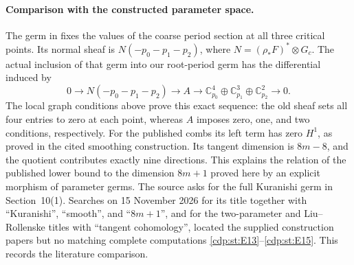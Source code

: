 \paragraph{Comparison with the constructed parameter space.}
The germ in \cite[Lemma labelled \texttt{paramspace} and
Proposition labelled \texttt{effective}]{Viaclovsky2026Combs}
fixes the values of the coarse period section at all three
critical points. Its normal sheaf is $N(-p_0-p_1-p_2)$, where
$N=(\rho_*F)^*\otimes G_c$. The actual inclusion of that germ
into our root-period germ has the differential induced by
\[
0\longrightarrow N(-p_0-p_1-p_2)\longrightarrow A
\longrightarrow
 \mathbb C_{p_0}^{4}\oplus\mathbb C_{p_1}^{3}
                     \oplus\mathbb C_{p_2}^{2}
\longrightarrow0.
\]
The local graph conditions above prove this exact sequence:
the old sheaf sets all four entries to zero at each point,
whereas $A$ imposes zero, one, and two conditions, respectively.
For the published combs its left term has zero $H^1$, as proved
in the cited smoothing construction. Its tangent dimension is
$8m-8$, and the quotient contributes exactly nine directions.
This explains the relation of the published lower bound to the
dimension $8m+1$ proved here by an explicit morphism of parameter
germs. The source asks for the full Kuranishi germ in
Section~10(1). Searches on 15 November 2026 for its title together
with ``Kuranishi'', ``smooth'', and ``$8m+1$'', and for the
two-parameter and Liu--Rollenske titles with ``tangent cohomology'',
located the supplied construction papers but no matching complete
computations \ref{cdp:st:E13}--\ref{cdp:st:E15}. This records the literature comparison.


